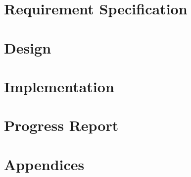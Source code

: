 \documentclass[paper=a4, fontsize=11pt,twoside]{scrartcl}		%
\begin{document}
\section{Requirement Specification}
\clearpage

\section{Design}
\clearpage

\section{Implementation}
\clearpage

\section{Progress Report}
\clearpage



\section{Appendices}
\clearpage


\end{document}
